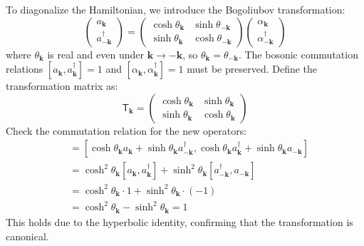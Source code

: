 \documentclass[aps, prx, nofootinbib, superscriptaddress]{revtex4-2}
\begin{document}
To diagonalize the Hamiltonian, we introduce the Bogoliubov transformation:
\begin{equation}
    \begin{pmatrix}
        a_{\mathbf{k}} \\
        a^{\dagger}_{-\mathbf{k}}
    \end{pmatrix}
    =
    \begin{pmatrix}
        \cosh \theta_{\mathbf{k}} & \sinh \theta_{-\mathbf{k}} \\
        \sinh \theta_{\mathbf{k}} & \cosh \theta_{-\mathbf{k}}
    \end{pmatrix}
    \begin{pmatrix}
        \alpha_{\mathbf{k}} \\
        \alpha^{\dagger}_{-\mathbf{k}}
    \end{pmatrix}
\end{equation}
where $ \theta_{\mathbf{k}} $ is real and even under $ \mathbf{k} \to -\mathbf{k} $, so $ \theta_{\mathbf{k}} = \theta_{-\mathbf{k}} $. The bosonic commutation relations $ [a_{\mathbf{k}}, a^{\dagger}_{\mathbf{k}}] = 1 $ and $ [\alpha_{\mathbf{k}}, \alpha^{\dagger}_{\mathbf{k}}] = 1 $ must be preserved. Define the transformation matrix as:
\begin{equation}
    \mathsf{T}_{\mathbf{k}} = 
    \begin{pmatrix}
        \cosh \theta_{\mathbf{k}} & \sinh \theta_{\mathbf{k}} \\
        \sinh \theta_{\mathbf{k}} & \cosh \theta_{\mathbf{k}}
    \end{pmatrix}
\end{equation}
Check the commutation relation for the new operators:
\begin{align}
    [\alpha_{\mathbf{k}}, \alpha^{\dagger}_{\mathbf{k}}] 
    &= [\cosh \theta_{\mathbf{k}} a_{\mathbf{k}} + \sinh \theta_{\mathbf{k}} a^{\dagger}_{-\mathbf{k}}, \cosh \theta_{\mathbf{k}} a^{\dagger}_{\mathbf{k}} + \sinh \theta_{\mathbf{k}} a_{-\mathbf{k}}]   \\
    &= \cosh^2 \theta_{\mathbf{k}} [a_{\mathbf{k}}, a^{\dagger}_{\mathbf{k}}] + \sinh^2 \theta_{\mathbf{k}} [a^{\dagger}_{-\mathbf{k}}, a_{-\mathbf{k}}]   \\
    &= \cosh^2 \theta_{\mathbf{k}} \cdot 1 + \sinh^2 \theta_{\mathbf{k}} \cdot (-1)   \\
    &= \cosh^2 \theta_{\mathbf{k}} - \sinh^2 \theta_{\mathbf{k}} = 1
\end{align}
This holds due to the hyperbolic identity, confirming that the transformation is canonical.
\end{document}
